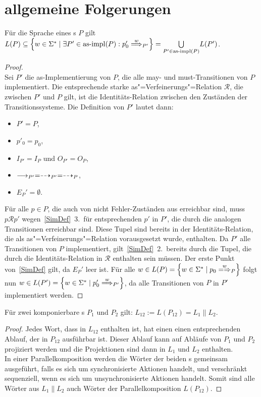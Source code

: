\chapter{allgemeine Folgerungen}

\begin{Prop}
  \label{LImpProp}
  Für die Sprache eines \MEIO{}s $P$ gilt $L(P) \subseteq \left\{w\in
  \Sigma ^* \mid \exists P'\in\asimp (P) : p'_0\weakmust[w]_{P'} \right\} =
  \underset{P'\in\asimp (P)}{\bigcup} L(P')$.
\end{Prop}
\begin{proof}\mbox{}\\
  Sei $P'$ die as-Implementierung von $P$, die alle may-
  und must-Transitionen von $P$ implementiert. Die entsprechende starke
  as"=Verfeinerungs"=Relation $\mathcal{R}$, die zwischen $P'$ und $P$ gilt,
  ist die Identitäts-Relation zwischen den Zuständen der Transitionssysteme. Die
  Definition von $P'$ lautet dann:
  \begin{itemize}
    \item $P'=P$,
    \item $p'_0=p_0$,
    \item $I_{P'}=I_P$ und $O_{P'}=O_P$,
    \item $\must _{P'} =\may _{P'} = \may _P$,
    \item $E_P'=\emptyset$.
  \end{itemize}
  Für alle $p\in P$, die auch von nicht Fehler-Zuständen aus erreichbar sind,
  muss $p\mathcal{R} p'$ wegen~\ref{SimDef}~3.\ für entsprechenden $p'$ in
  $P'$, die durch die analogen Transitionen erreichbar sind. Diese Tupel sind
  bereits in der Identitäts-Relation, die als as"=Verfeinerungs"=Relation
  vorausgesetzt wurde, enthalten. Da $P'$ alle Transitionen von $P$
  implementiert, gilt~\ref{SimDef}~2.\ bereits durch die Tupel, die durch die
  Identitäts-Relation in $\mathcal{R}$ enthalten sein müssen. Der erste Punkt
  von~\ref{SimDef} gilt, da $E_P'$ leer ist. Für alle $w\in L(P) = \left\{w\in
  \Sigma ^* \mid p_0\weakmay[w]_P\right\}$ folgt nun $w\in L(P') = \left\{w\in
  \Sigma ^* \mid p'_0\weakmust[w]_{P'}\right\}$, da alle Transitionen von $P$
  in $P'$ implementiert werden.
\end{proof}

\begin{Prop}
  \label{LParallelProp}
  Für zwei komponierbare \MEIO{}s $P_1$ und $P_2$ gilt: $L_{12} := L(P_{12}) =
  L_1\|L_2$.
\end{Prop}
\begin{proof}
  Jedes Wort, dass in $L_{12}$ enthalten ist, hat einen einen entsprechenden
  Ablauf, der in $P_{12}$ ausführbar ist. Dieser Ablauf kann auf Abläufe von
  $P_1$ und $P_2$ projiziert werden und die Projektionen sind dann in $L_1$ und
  $L_2$ enthalten.\\
  In einer Parallelkomposition werden die Wörter der beiden \MEIO{}s gemeinsam
  ausgeführt, falls es sich um synchronisierte Aktionen handelt, und
  verschränkt sequenziell, wenn es sich um unsynchronisierte Aktionen handelt.
  Somit sind alle Wörter aus $L_1\|L_2$ auch Wörter der Parallelkomposition
  $L(P_{12})$.
\end{proof}

